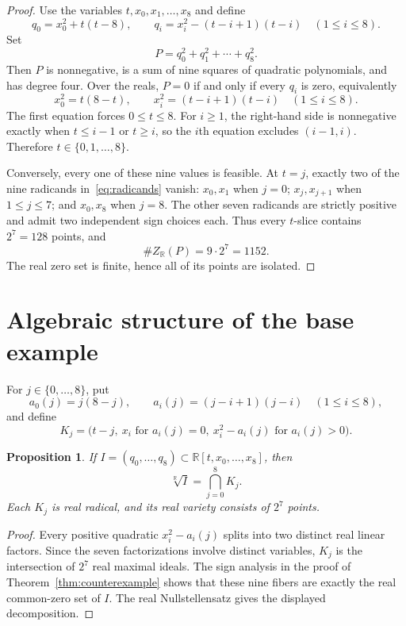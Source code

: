 \documentclass[a4paper,11pt]{amsart}
\newtheorem{proposition}[theorem]{Proposition}
\theoremstyle{remark}
\newcommand{\R}{\mathbb R}
\begin{document}
\begin{proof}
Use the variables $t,x_0,x_1,\ldots,x_8$ and define
\begin{equation}\label{eq:qbase}
 q_0=x_0^2+t(t-8),\qquad
 q_i=x_i^2-(t-i+1)(t-i)\quad(1\le i\le8).
\end{equation}
Set
\[
 P=q_0^2+q_1^2+\cdots+q_8^2.
\]
Then $P$ is nonnegative, is a sum of nine squares of quadratic polynomials, and has degree four. Over the reals, $P=0$ if and only if every $q_i$ is zero, equivalently
\begin{equation}\label{eq:radicands}
 x_0^2=t(8-t),\qquad
 x_i^2=(t-i+1)(t-i)\quad(1\le i\le8).
\end{equation}
The first equation forces $0\le t\le8$. For $i\ge1$, the right-hand side is nonnegative exactly when $t\le i-1$ or $t\ge i$, so the $i$th equation excludes $(i-1,i)$. Therefore $t\in\{0,1,\ldots,8\}$.

Conversely, every one of these nine values is feasible. At $t=j$, exactly two of the nine radicands in~\eqref{eq:radicands} vanish: $x_0,x_1$ when $j=0$; $x_j,x_{j+1}$ when $1\le j\le7$; and $x_0,x_8$ when $j=8$. The other seven radicands are strictly positive and admit two independent sign choices each. Thus every $t$-slice contains $2^7=128$ points, and
\[
 \#Z_{\R}(P)=9\cdot2^7=1152.
\]
The real zero set is finite, hence all of its points are isolated.
\end{proof}

\section{Algebraic structure of the base example}

For $j\in\{0,\ldots,8\}$, put
\[
 a_0(j)=j(8-j),\qquad
 a_i(j)=(j-i+1)(j-i)\quad(1\le i\le8),
\]
and define
\[
 K_j=\bigl(t-j,\ x_i\text{ for }a_i(j)=0,\ x_i^2-a_i(j)\text{ for }a_i(j)>0\bigr).
\]

\begin{proposition}\label{prop:radical}
If $I=(q_0,\ldots,q_8)\subset\R[t,x_0,\ldots,x_8]$, then
\[
 \sqrt[\R]{I}=\bigcap_{j=0}^8K_j.
\]
Each $K_j$ is real radical, and its real variety consists of $2^7$ points.
\end{proposition}

\begin{proof}
Every positive quadratic $x_i^2-a_i(j)$ splits into two distinct real linear factors. Since the seven factorizations involve distinct variables, $K_j$ is the intersection of $2^7$ real maximal ideals. The sign analysis in the proof of Theorem~\ref{thm:counterexample} shows that these nine fibers are exactly the real common-zero set of $I$. The real Nullstellensatz gives the displayed decomposition.
\end{proof}
\end{document}
